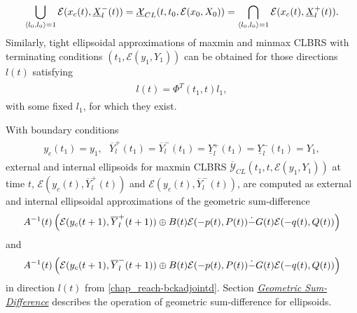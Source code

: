 \documentclass[letterpaper,10pt,english]{sphinxmanual}
\begin{document}
\begin{gather}
\begin{split}\bigcup_{\langle l_0,l_0\rangle=1}{\mathcal E}(x_c(t),\underline{X}^-_l(t)) =
\underline{{\mathcal X}}_{CL}(t,t_0,{\mathcal E}(x_0,X_0)) =
\bigcap_{\langle l_0,l_0\rangle=1}{\mathcal E}(x_c(t),\underline{X}^+_l(t)).\end{split}\notag
\end{gather}
Similarly, tight ellipsoidal approximations of maxmin and minmax CLBRS
with terminating conditions \((t_1, {\mathcal E}(y_1,Y_1))\) can be
obtained for those directions \(l(t)\) satisfying
\label{chap_reach:equation-bckadjointd}\begin{gather}
\begin{split}l(t) = \Phi^T(t_1,t)l_1,\end{split}\label{chap_reach-bckadjointd}
\end{gather}
with some fixed \(l_1\), for which they exist.

With boundary conditions
\label{chap_reach:equation-bndconds}\begin{gather}
\begin{split}y_c(t_1)=y_1, ~~~ \overline{Y}^+_l(t_1)=\overline{Y}^-_l(t_1)=\underline{Y}^+_l(t_1)=\underline{Y}^-_l(t_1)=Y_1,\end{split}\label{chap_reach-bndconds}
\end{gather}
external and internal ellipsoids for maxmin CLBRS
\(\overline{{\mathcal Y}}_{CL}(t_1,t,{\mathcal E}(y_1,Y_1))\) at
time \(t\), \({\mathcal E}(y_c(t),\overline{Y}^+_l(t))\) and
\({\mathcal E}(y_c(t),\overline{Y}^-_l(t))\), are computed as
external and internal ellipsoidal approximations of the geometric
sum-difference
\begin{gather}
\begin{split}A^{-1}(t)\left(
{\mathcal E}(y_c(t+1),\overline{Y}^+_l(t+1)) \oplus B(t){\mathcal E}(-p(t),P(t))
\dot{-}G(t){\mathcal E}(-q(t),Q(t))
\right)\end{split}\notag
\end{gather}
and
\begin{gather}
\begin{split}A^{-1}(t)\left(
{\mathcal E}(y_c(t+1),\overline{Y}^-_l(t+1)) \oplus B(t){\mathcal E}(-p(t),P(t))
\dot{-}G(t){\mathcal E}(-q(t),Q(t))
\right)\end{split}\notag
\end{gather}
in direction \(l(t)\) from \eqref{chap_reach-bckadjointd}. Section
{\hyperref[chap_ellcalc:sum-diff-label]{\emph{Geometric Sum-Difference}}} describes the operation of geometric
sum-difference for ellipsoids.
\end{document}

